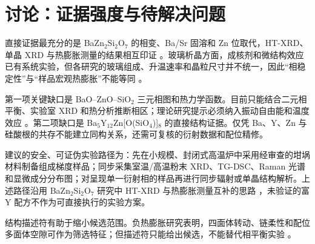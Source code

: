 \section{讨论：证据强度与待解决问题}

直接证据最充分的是 BaZn$_2$Si$_2$O$_7$ 的相变、Ba\slash Sr 固溶和 Zn 位取代，HT\nobreakdash-XRD、单晶 XRD 与热膨胀测量的结果相互印证 \cite{lin1999phase,thieme2015ba1,kerstan2012thermal,thieme2016new}。玻璃析晶方面，成核剂和微结构效应已有系统实验，但各研究的玻璃组成、升温速率和晶粒尺寸并不统一，因此“相稳定性”与“样品宏观热膨胀”不能等同 \cite{thieme2016thermal,vladislavova2018crystallisation}。

第一项关键缺口是 BaO--ZnO--SiO$_2$ 三元相图和热力学函数。目前只能结合二元相平衡、实验室 XRD 和热分析推断相区；理论研究提示必须纳入振动自由能和温度效应 \cite{erlebach2021phase}。第二项缺口是 Ba$_5$Y$_{12}$Zn[O(SiO$_4$)]$_8$ 的直接结构证据。仅凭 Ba、Y、Zn 与硅酸根的共存不能建立同构关系，还需可复核的衍射数据和配位精修。

建议的安全、可证伪实验路径为：先在小规模、封闭式高温炉中采用经审查的坩埚材料制备组成梯度样品；同步采集室温/高温粉末 XRD、TG\nobreakdash-DSC、Raman 光谱和显微成分分布图；对呈现单一衍射相的样品再进行同步辐射或单晶结构解析。上述路径沿用 BaZn$_2$Si$_2$O$_7$ 研究中 HT\nobreakdash-XRD 与热膨胀测量互补的思路 \cite{kerstan2012thermal,thieme2016very}，未验证的富 Y 配方不作为可直接执行的实验方案。

结构描述符有助于缩小候选范围。负热膨胀研究表明，四面体转动、链柔性和配位多面体空隙可作为筛选特征；但描述符只能给出候选，不能替代相平衡实验 \cite{kireeva2022pauling,erlebach2021phase}。
